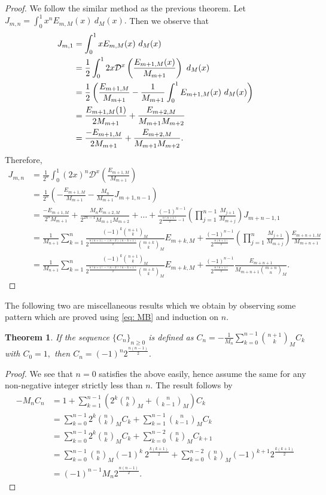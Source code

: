 \documentclass[12pt, a4paper]{article}
\newtheorem{theorem}{Theorem}[section]
\begin{document}
\begin{proof}
We follow the similar method as the previous theorem. Let $J_{m,n} = \int_{0}^{1}x^nE_{m,M}(x)~d_M(x).$ Then we observe that
\begin{align*} %
J_{m,1} &= \int_{0}^{1}xE_{m,M}(x)~d_M(x)\notag\\ 
&= \frac{1}{2} \int_{0}^{1}2x\mathcal{D}^x\left(\frac{E_{m+1,M}(x)}{M_{m+1}}\right)~d_M(x)\notag\\
&= \frac{1}{2}\left(\frac{E_{m+1,M}}{M_{m+1}}-\frac{1}{M_{m+1}}\int_{0}^{1} E_{m+1,M}(x)~d_M(x)\right)\notag\\
&= \frac{E_{m+1,M}(1)}{2M_{m+1}}+\frac{E_{m+2,M}}{M_{m+1}M_{m+2}} \notag\\
&= \frac{-E_{m+1,M}}{2M_{m+1}}+\frac{E_{m+2,M}}{M_{m+1}M_{m+2}}.
\end{align*}
Therefore,
\begin{align*}
J_{m,n} &= \frac{1}{2^n}\int_{0}^{1} (2x)^n\mathcal{D}^x\left(\frac{E_{m+1,M}}{M_{m+1}}\right)\\
&= \frac{1}{2^n}\left(-\frac{E_{m+1,M}}{M_{m+1}}-\frac{M_n}{M_{m+1}}J_{m+1,n-1}\right)\\
&=\frac{-E_{m+1,M}}{2^nM_{m+1}}+\frac{M_nE_{m+2,M}}{2^{2n-1}M_{m+1}M_{m+2}}+\dots+\frac{(-1)^{n-1}}{2^{\frac{n(n+1)}{2}-1}}\left(\prod_{j=1}^{n-1}\frac{M_{j+1}}{M_{m+j}}\right)J_{m+n-1,1}\\
&= \frac{1}{M_{n+1}}\sum_{k=1}^{n}\frac{(-1)^{k}\binom{n+1}{k}_M}{2^{\frac{n(n+1)-(n-k)(n-k+1)}{2}}\binom{m+k}{k}_M}E_{m+k,M}+\frac{(-1)^{n-1}}{2^{\frac{n(n+1)}{2}}}\left(\prod_{j=1}^{n}\frac{M_{j+1}}{M_{m+j}}\right)\frac{E_{m+n+1,M}}{M_{m+n+1}}\\
&=  \frac{1}{M_{n+1}}\sum_{k=1}^{n}\frac{(-1)^{k}\binom{n+1}{k}_M}{2^{\frac{n(n+1)-(n-k)(n-k+1)}{2}}\binom{m+k}{k}_M}E_{m+k,M}+\frac{(-1)^{n-1}}{2^{\frac{n(n+1)}{2}}}\frac{E_{m+n+1}}{M_{m+n+1}\binom{m+n}{n}_M}.
\end{align*}
\end{proof}
The following two are miscellaneous results which we obtain by observing some pattern which are proved using \eqref{eq: MB} and induction on $n.$
\begin{theorem}
If the sequence $\{C_n\}_{n \geq 0}$ is defined as 
$C_n = -\frac{1}{M_n}\sum_{k=0}^{n-1}\binom{n+1}{k}_MC_k$
with $C_0 = 1,$ then
$C_n = (-1)^n 2^{\frac{n(n-1)}{2}}.$
\end{theorem}
\begin{proof}
We see that $n=0$ satisfies the above easily, hence assume the same for any non-negative integer strictly less than $n .$ The result follows by
\begin{align*}
-M_{n}C_n &= 1+ \sum_{k=1}^{n-1}\left(2^k\binom{n}{k}_M+\binom{n}{k-1}_M\right)C_k\\
&= \sum_{k=0}^{n-1}2^k\binom{n}{k}_MC_k +\sum_{k=1}^{n-1}\binom{n}{k-1}_MC_k\\
&= \sum_{k=0}^{n-1}2^k\binom{n}{k}_MC_k + \sum_{k=0}^{n-2}\binom{n}{k}_MC_{k+1}\\
&= \sum_{k=0}^{n-1}\binom{n}{k}_M (-1)^k ~2^{\frac{k(k+1)}{2}} + \sum_{k=0}^{n-2}\binom{n}{k}_M (-1)^{k+1}2^{\frac{k(k+1)}{2}}\\
&= (-1)^{n-1}M_{n}2^{\frac{n(n-1)}{2}}.
\end{align*}
\end{proof}
\end{document}
